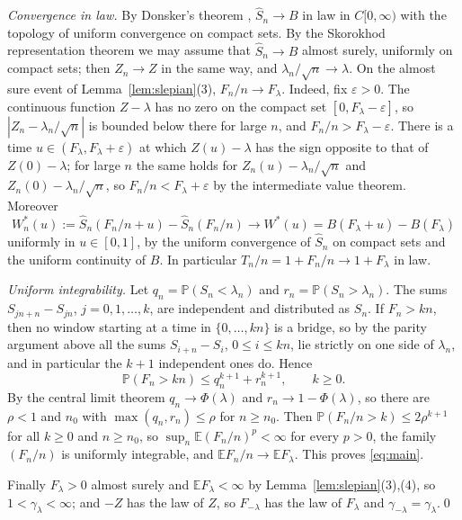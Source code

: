 \documentclass[11pt]{amsart}
\theoremstyle{remark}
\numberwithin{equation}{section}
\newcommand{\PP}{\mathbb{P}}
\newcommand{\EE}{\mathbb{E}}
\begin{document}
\emph{Convergence in law.} By Donsker's theorem \cite{Bil}, $\widehat S_n\to B$ in law in $C[0,\infty)$ with the topology of uniform convergence on compact sets. By the Skorokhod representation theorem \cite{Bil} we may assume that $\widehat S_n\to B$ almost surely, uniformly on compact sets; then $Z_n\to Z$ in the same way, and $\lambda_n/\sqrt n\to\lambda$. On the almost sure event of Lemma~\ref{lem:slepian}(3), $F_n/n\to F_\lambda$. Indeed, fix $\varepsilon>0$. The continuous function $Z-\lambda$ has no zero on the compact set $[0,F_\lambda-\varepsilon]$, so $|Z_n-\lambda_n/\sqrt n|$ is bounded below there for large $n$, and $F_n/n>F_\lambda-\varepsilon$. There is a time $u\in(F_\lambda,F_\lambda+\varepsilon)$ at which $Z(u)-\lambda$ has the sign opposite to that of $Z(0)-\lambda$; for large $n$ the same holds for $Z_n(u)-\lambda_n/\sqrt n$ and $Z_n(0)-\lambda_n/\sqrt n$, so $F_n/n<F_\lambda+\varepsilon$ by the intermediate value theorem. Moreover
\begin{equation}\label{eq:after}
W_n^*(u):=\widehat S_n(F_n/n+u)-\widehat S_n(F_n/n)\to W^*(u)=B(F_\lambda+u)-B(F_\lambda)
\end{equation}
uniformly in $u\in[0,1]$, by the uniform convergence of $\widehat S_n$ on compact sets and the uniform continuity of $B$. In particular $T_n/n=1+F_n/n\to1+F_\lambda$ in law.

\emph{Uniform integrability.} Let $q_n=\PP(S_n<\lambda_n)$ and $r_n=\PP(S_n>\lambda_n)$. The sums $S_{jn+n}-S_{jn}$, $j=0,1,\dots,k$, are independent and distributed as $S_n$. If $F_n>kn$, then no window starting at a time in $\{0,\dots,kn\}$ is a bridge, so by the parity argument above all the sums $S_{i+n}-S_i$, $0\le i\le kn$, lie strictly on one side of $\lambda_n$, and in particular the $k+1$ independent ones do. Hence
\begin{equation}\label{eq:tail}
\PP(F_n>kn)\le q_n^{k+1}+r_n^{k+1},\qquad k\ge0.
\end{equation}
By the central limit theorem $q_n\to\Phi(\lambda)$ and $r_n\to1-\Phi(\lambda)$, so there are $\rho<1$ and $n_0$ with $\max(q_n,r_n)\le\rho$ for $n\ge n_0$. Then $\PP(F_n/n>k)\le2\rho^{k+1}$ for all $k\ge0$ and $n\ge n_0$, so $\sup_n\EE(F_n/n)^p<\infty$ for every $p>0$, the family $(F_n/n)$ is uniformly integrable, and $\EE F_n/n\to\EE F_\lambda$. This proves \eqref{eq:main}.

Finally $F_\lambda>0$ almost surely and $\EE F_\lambda<\infty$ by Lemma~\ref{lem:slepian}(3),(4), so $1<\gamma_\lambda<\infty$; and $-Z$ has the law of $Z$, so $F_{-\lambda}$ has the law of $F_\lambda$ and $\gamma_{-\lambda}=\gamma_\lambda$.\qed
\end{document}
